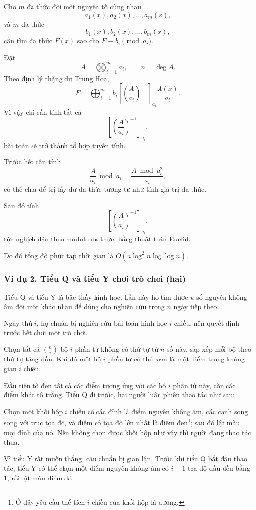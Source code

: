 \documentclass[11pt]{article}
\begin{document}
Cho \(m\) đa thức đôi một nguyên tố cùng nhau
\[
  a_1(x),a_2(x),\ldots,a_m(x),
\]
và \(m\) đa thức
\[
  b_1(x),b_2(x),\ldots,b_m(x),
\]
cần tìm đa thức \(F(x)\) sao cho \(F\equiv b_i\pmod {a_i}\).

Đặt
\[
  A=\bigotimes_{i=1}^m a_i,\qquad n=\deg A.
\]
Theo định lý thặng dư Trung Hoa,
\[
  F=
  \bigoplus_{i=1}^m
  b_i
  \left[
    \left(\frac{A}{a_i}\right)^{-1}
  \right]_{a_i}
  \frac{A(x)}{a_i}.
\]
Vì vậy chỉ cần tính tất cả
\[
  \left[
    \left(\frac{A}{a_i}\right)^{-1}
  \right]_{a_i},
\]
bài toán sẽ trở thành tổ hợp tuyến tính.

Trước hết cần tính
\[
  \frac{A}{a_i}\bmod a_i=\frac{A\bmod a_i^2}{a_i},
\]
có thể chia để trị lấy dư đa thức tương tự như tính giá trị đa thức.

Sau đó tính
\[
  \left[
    \left(\frac{A}{a_i}\right)^{-1}
  \right]_{a_i},
\]
tức nghịch đảo theo modulo đa thức, bằng thuật toán Euclid.

Do đó tổng độ phức tạp thời gian là \(O(n\log^2 n\log\log n)\).

\subsubsection{Ví dụ 2. Tiểu Q và tiểu Y chơi trò chơi (hai)}

Tiểu Q và tiểu Y là bậc thầy hình học. Lần này họ tìm được \(n\) số nguyên
không âm đôi một khác nhau để dùng cho nghiên cứu trong \(n\) ngày tiếp theo.

Ngày thứ \(i\), họ chuẩn bị nghiên cứu bài toán hình học \(i\) chiều, nên quyết
định trước hết chơi một trò chơi.

Chọn tất cả \(\binom ni\) bộ \(i\) phần tử không có thứ tự từ \(n\) số này, sắp
xếp mỗi bộ theo thứ tự tăng dần. Khi đó một bộ \(i\) phần tử có thể xem là một
điểm trong không gian \(i\) chiều.

Đầu tiên tô đen tất cả các điểm tương ứng với các bộ \(i\) phần tử này, còn các
điểm khác tô trắng. Tiểu Q đi trước, hai người luân phiên thao tác như sau:

Chọn một khối hộp \(i\) chiều có các đỉnh là điểm nguyên không âm, các cạnh song
song với trục tọa độ, và điểm có tọa độ lớn nhất là điểm đen\footnote{Ở đây yêu
cầu thể tích \(i\) chiều của khối hộp là dương.}; sau đó lật màu mọi đỉnh của
nó. Nếu không chọn được khối hộp như vậy thì người đang thao tác thua.

Vì tiểu Y rất muốn thắng, cậu chuẩn bị gian lận. Trước khi tiểu Q bắt đầu thao
tác, tiểu Y có thể chọn một điểm nguyên không âm có \(i-1\) tọa độ đầu đều bằng
\(1\), rồi lật màu điểm đó.
\end{document}
